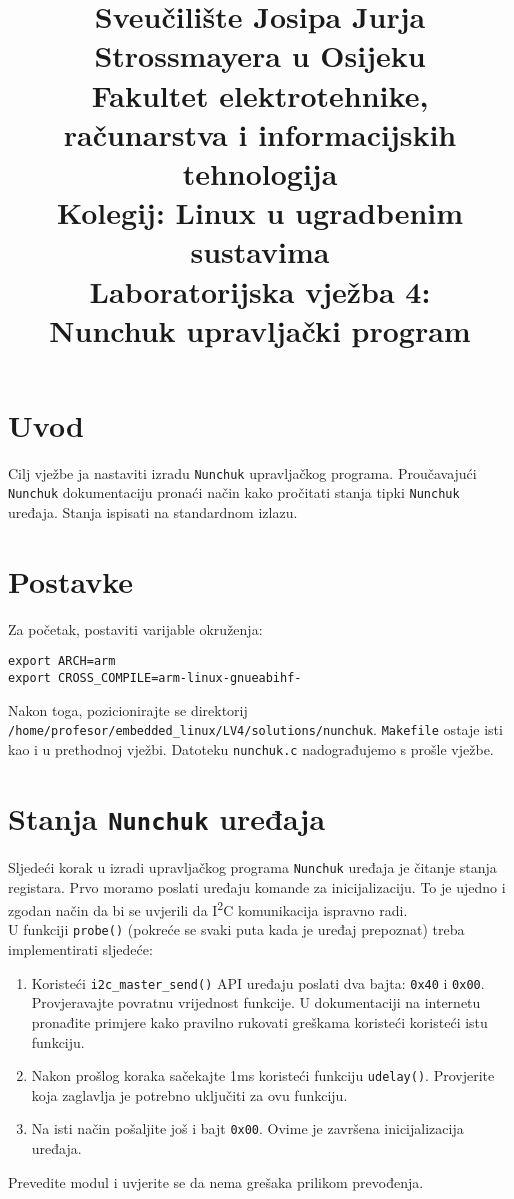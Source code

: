 \documentclass[11pt]{article}
\title{
	\Large Sveučilište Josipa Jurja Strossmayera u Osijeku \\
	Fakultet elektrotehnike, računarstva i informacijskih tehnologija \\
	\vspace{4cm}
	\Large Kolegij: Linux u ugradbenim sustavima \\
	\vspace{4cm}
	\Large \textbf{Laboratorijska vježba 4:\\
	Nunchuk upravljački program}
	}
\date{}
\begin{document}
\maketitle
\thispagestyle{empty}
\newpage

\section{Uvod}
Cilj vježbe ja nastaviti izradu \texttt{Nunchuk} upravljačkog programa.
Proučavajući \texttt{Nunchuk} dokumentaciju pronaći način kako pročitati
stanja tipki \texttt{Nunchuk} uređaja. Stanja ispisati na standardnom izlazu.

\section{Postavke}
Za početak, postaviti varijable okruženja:
\begin{lstlisting}
export ARCH=arm
export CROSS_COMPILE=arm-linux-gnueabihf-
\end{lstlisting}
Nakon toga, pozicionirajte se direktorij
\texttt{/home/profesor/embedded\_linux/LV4/solutions/nunchuk}. \texttt{Makefile}
ostaje isti kao i u prethodnoj vježbi. Datoteku \texttt{nunchuk.c} nadograđujemo
s prošle vježbe.

\section{Stanja \texttt{Nunchuk} uređaja}
Sljedeći korak u izradi upravljačkog programa \texttt{Nunchuk} uređaja je
čitanje stanja registara. Prvo moramo poslati uređaju komande za inicijalizaciju.
To je ujedno i zgodan način da bi se uvjerili da I\textsuperscript{2}C komunikacija
ispravno radi.\\
\newline
U funkciji \texttt{probe()} (pokreće se svaki puta kada je uređaj prepoznat)
treba implementirati sljedeće:
\begin{enumerate}
	\item Koristeći \texttt{i2c\_master\_send()} API uređaju poslati dva bajta:
		\texttt{0x40} i \texttt{0x00}. Provjeravajte povratnu vrijednost
		funkcije. U dokumentaciji na internetu pronađite primjere kako pravilno
		rukovati greškama koristeći koristeći istu funkciju.
	\item Nakon prošlog koraka sačekajte 1ms koristeći funkciju \texttt{udelay()}.
		Provjerite koja zaglavlja je potrebno uključiti za ovu funkciju.
	\item Na isti način pošaljite još i bajt \texttt{0x00}. Ovime je završena
		inicijalizacija uređaja.
\end{enumerate}
Prevedite modul i uvjerite se da nema grešaka prilikom prevođenja.
\end{document}
